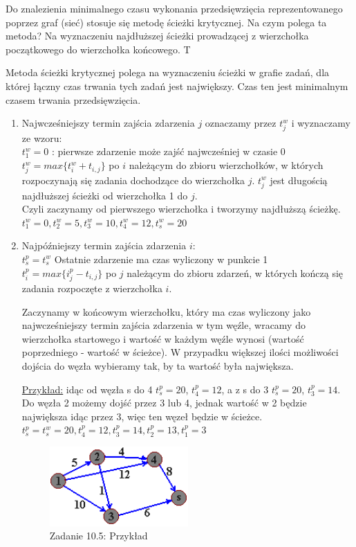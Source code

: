 \answer
{Do znalezienia minimalnego czasu wykonania przedsięwzięcia reprezentowanego poprzez graf (sieć) stosuje się metodę ścieżki krytycznej. Na czym polega ta metoda?}
{Na wyznaczeniu najdłuższej ścieżki prowadzącej z wierzchołka początkowego do wierzchołka końcowego.}
{T}
{}
{
Metoda ścieżki krytycznej polega na wyznaczeniu ścieżki w grafie zadań, dla której łączny czas trwania tych zadań jest największy. Czas ten jest minimalnym czasem trwania przedsięwzięcia.

\begin{enumerate}
\item{Najwcześniejszy termin zajścia zdarzenia $j$ oznaczamy przez $t_{j}^w$ i wyznaczamy ze wzoru:\\
$t_1^w = 0 $ : pierwsze zdarzenie może zajść najwcześniej w czasie 0 \\
$t_j^w = max\{t_i^w+t_{i,j}\}$ po $i$ należącym do zbioru wierzchołków, w których rozpoczynają się zadania dochodzące do wierzchołka $j$. $t_j^w$ jest długością najdłuższej ścieżki od wierzchołka 1 do $j$.\\
Czyli zaczynamy od pierwszego wierzchołka i tworzymy najdłuższą ścieżkę.\\
$t_1^w=0, t_2^w=5, t_3^w=10, t_4^w=12, t_s^w=20$}

\item{Najpóźniejszy termin zajścia zdarzenia $i$:\\
$t_s^p = t_s^w$ Ostatnie zdarzenie ma czas wyliczony w punkcie 1\\
$t_i^p = max \{i_j^p - t_{i,j}\}$ po $j$ należącym do zbioru zdarzeń, w których kończą się zadania rozpoczęte z wierzchołka $i$.

Zaczynamy w końcowym wierzchołku, który ma czas wyliczony jako najwcześniejszy termin zajścia zdarzenia w tym węźle, wracamy do wierzchołka startowego i wartość w każdym węźle wynosi (wartość poprzedniego - wartość w ścieżce). W przypadku większej ilości możliwości dojścia do węzła wybieramy tak, by ta wartość była największa. 

\underline{Przykład:} idąc od węzła s do 4 $t_s^p = 20$, $t_4^p = 12$, a z s do 3  $t_s^p = 20$, $t_3^p = 14$. Do węzła 2 możemy dojść przez 3 lub 4, jednak wartość w 2 będzie największa idąc przez 3, więc ten węzeł będzie w ścieżce.
$t_s^p=t_s^w=20, t_4^p=12, t_3^p=14, t_2^p=13, t_1^p=3$}

\begin{figure}[!ht]
\centering
\includegraphics[width=0.5\textwidth]{10/cpm}
\caption*{Zadanie 10.5: Przykład}
\end{figure}

\end{enumerate}
}



